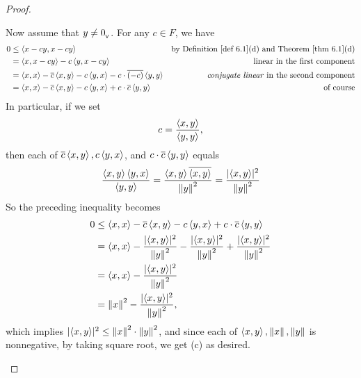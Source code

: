 \begin{proof}
\begin{enumerate}
Now assume that \(y \ne 0_{_{\textsf{V}}}\).
For any \(c \in F\), we have
\begin{align*}
    0 & \le \LG x - cy, x - cy \RG & \text{by \DEF{6.1}(d) and \THM{6.1}(d)} \\
      & = \LG x, x - cy \RG - c \LG y, x - cy \RG & \text{linear in the first component} \\
      & = \LG x, x \RG - \conjugatet{c} \LG x, y \RG - c \LG y, x \RG - c \cdot \conjugatet{(-c)} \LG y, y \RG & \text{\emph{conjugate linear} in the second component} \\
      & = \LG x, x \RG - \conjugatet{c} \LG x, y \RG - c \LG y, x \RG + c \cdot \conjugatet{c} \LG y, y \RG & \text{of course}
\end{align*}
In particular, if we set
\[
    c = \frac{\left< x, y \right>}{\left< y, y \right>},
\]
then each of \(\overline{c} \left< x, y \right>, c \left< y, x \right>\), and \(c \cdot \overline{c} \left< y, y \right>\) equals
\[
    \frac{\left< x, y \right> \left< y, x \right>}{\left< y, y \right>}
    = \frac{\left< x, y \right> \overline{\left< x, y \right>}}{\left\lVert y\right\rVert^2}
    = \frac{\lvert \left< x, y \right> \rvert^2}{\left\lVert y\right\rVert^2}
\]
So the preceding inequality becomes
\begin{align*}
    0 & \le \left< x, x \right> - \overline{c} \left< x, y \right> - c \left< y, x \right> + c \cdot \overline{c} \left< y, y \right> \\
      & = \left< x, x \right> - \frac{\lvert \left< x, y \right> \rvert^2}{\left\lVert y\right\rVert^2} - \frac{\lvert \left< x, y \right> \rvert^2}{\left\lVert y\right\rVert^2} + \frac{\lvert \left< x, y \right> \rvert^2}{\left\lVert y\right\rVert^2} \\
      & = \left< x, x \right> - \frac{\lvert \left< x, y \right> \rvert^2}{\left\lVert y\right\rVert^2} \\
      & = \left\lVert x\right\rVert^2 - \frac{\lvert \left< x, y \right> \rvert^2}{\left\lVert y\right\rVert^2},
\end{align*}
which implies \(\lvert \left< x, y \right> \rvert^2 \le \left\lVert x\right\rVert^2 \cdot \left\lVert y\right\rVert^2\), and since each of \(\left< x, y \right>, \left\lVert x\right\rVert, \left\lVert y\right\rVert\) is nonnegative, by taking square root, we get (c) as desired.


\end{enumerate}
\end{proof}
